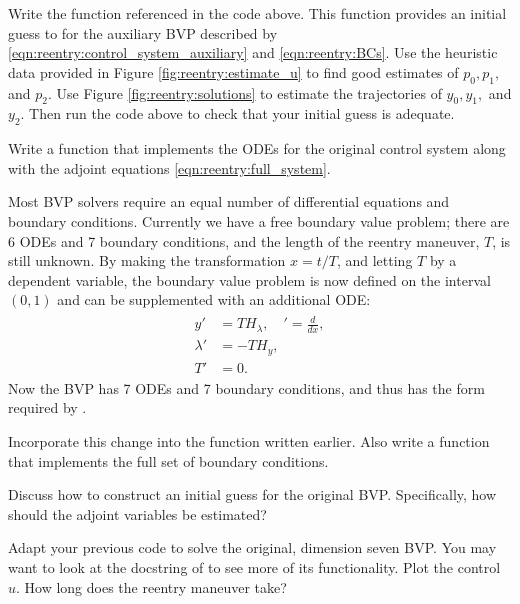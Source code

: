 \begin{problem}
	Write the function  referenced in the code above. 
	This function provides an initial guess to  for the auxiliary BVP described by  \eqref{eqn:reentry:control_system_auxiliary} and \eqref{eqn:reentry:BCs}.
	Use the heuristic data provided in Figure \ref{fig:reentry:estimate_u} to find good estimates of $p_0, p_1,$ and $p_2$. 
	Use Figure \ref{fig:reentry:solutions} to estimate the trajectories of $y_0, y_1,$ and $y_2$.
	Then run the code above to check that your initial guess is adequate. 
\end{problem}


\begin{problem}
	Write a function  that implements the ODEs for the original control system along with the adjoint equations \eqref{eqn:reentry:full_system}. 
\end{problem}

Most BVP solvers require an equal number of differential equations and boundary conditions. 
Currently we have a free boundary value problem; there are 6 ODEs and 7 boundary conditions, and the length of the reentry maneuver, $T$, is still unknown. 
By making the transformation $x = t/T$, and letting $T$ by a dependent variable, the boundary value problem is now defined on the interval $(0,1)$ and can be supplemented with an additional ODE: 
\begin{align}
\begin{split}
	y' &= TH_{\lambda},\quad ' = \frac{d}{dx},\\
	\lambda' &= -TH_{y},\\
	T' &= 0. \label{eqn:reentry:full_system}
\end{split}	
\end{align}
Now the BVP has 7 ODEs and 7 boundary conditions, and thus has the form required by . 

\begin{problem}
Incorporate this change into the function  written earlier. 
Also write a function  that implements the full set of boundary conditions. 
\end{problem}

Discuss how to construct an initial guess for the original BVP. Specifically, how should the adjoint variables be estimated?
\begin{problem}
	Adapt your previous code to solve the original, dimension seven BVP. You may want to look at the docstring of  to see more of its functionality.
	Plot the control $u$. How long does the reentry maneuver take? 
\end{problem}


